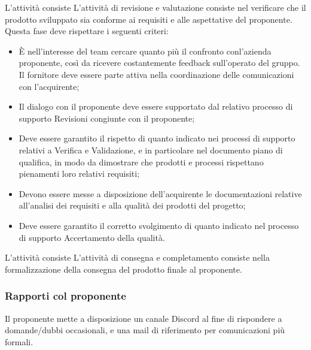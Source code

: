 L'attività consiste L'attività di revisione e valutazione consiste nel verificare che il prodotto sviluppato sia conforme ai requisiti e alle aspettative del proponente. Questa fase deve rispettare i seguenti criteri:
\begin{itemize}
    \item È nell’interesse del team cercare quanto più il confronto conl’azienda proponente, così da ricevere costantemente feedback sull’operato del gruppo. Il fornitore deve essere parte attiva nella coordinazione delle comunicazioni con l’acquirente;
    \item Il dialogo con il proponente deve essere supportato dal relativo processo di supporto Revisioni congiunte con il proponente;
    \item Deve essere garantito il rispetto di quanto indicato nei processi di supporto relativi a Verifica e Validazione, e in particolare nel documento piano di qualifica, in modo da dimostrare che prodotti e processi rispettano pienamenti loro relativi requisiti;
    \item Devono essere messe a disposizione dell’acquirente le documentazioni relative all’analisi dei requisiti e alla qualità dei prodotti del progetto;
    \item Deve essere garantito il corretto svolgimento di quanto indicato nel processo di supporto Accertamento della qualità.
\end{itemize}

L'attività consiste L'attività di consegna e completamento consiste nella formalizzazione della consegna del prodotto finale al proponente.


\subsubsection{Rapporti col proponente}
Il proponente mette a disposizione un canale Discord al fine di rispondere a domande/dubbi occasionali, e una mail di riferimento per comunicazioni più formali.

